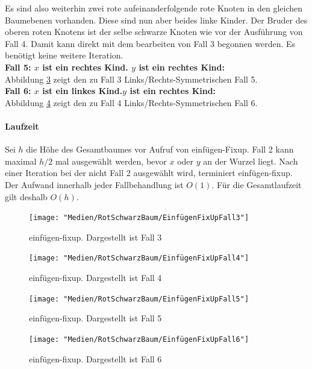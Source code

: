 \documentclass[a4paper,12pt]{article}
\begin{document}
\noindent Es sind also weiterhin zwei rote aufeinanderfolgende rote Knoten in den gleichen Baumebenen vorhanden. Diese sind nun aber beides linke Kinder. Der Bruder des oberen roten Knotens ist der selbe schwarze Knoten wie vor der Ausführung von Fall 4. Damit kann direkt mit dem bearbeiten von Fall 3 begonnen werden. Es benötigt keine weitere Iteration.\\

\noindent\textbf{Fall 5: $x$ ist ein rechtes Kind. $y$ ist ein rechtes Kind: }\\ 
Abbildung \ref{fig:EinfügenFixUpFall5} zeigt den zu Fall 3 Links/Rechts-Symmetrischen Fall 5.\\
\noindent\textbf{Fall 6:  $x$ ist ein linkes Kind.$y$ ist ein rechtes Kind: }\\ 
Abbildung \ref{fig:EinfügenFixUpFall6} zeigt den zu Fall 4 Links/Rechts-Symmetrischen Fall 6.\\


\paragraph{Laufzeit}
\noindent  Sei $h$ die Höhe des Gesamtbaumes vor Aufruf von einfügen-Fixup. Fall 2 kann maximal $h / 2$ mal ausgewählt werden, bevor $x$ oder $y$ an der Wurzel liegt. Nach einer Iteration bei der nicht Fall 2 ausgewählt wird, terminiert einfügen-fixup. Der Aufwand innerhalb jeder Fallbehandlung ist $O(1)$. Für die Gesamtlaufzeit gilt deshalb $\mathit{O(h)}$.
\begin{figure}[H]
	\centering
	\texttt{[image: "Medien/RotSchwarzBaum/EinfügenFixUpFall3"]}
	\caption{einfügen-fixup. Dargestellt ist Fall 3  }
	\label{fig:EinfügenFixUpFall3}
\end{figure}

\begin{figure}[h]
	\centering
	\texttt{[image: "Medien/RotSchwarzBaum/EinfügenFixUpFall4"]}
	\caption{einfügen-fixup. Dargestellt ist Fall 4  }
	\label{fig:EinfügenFixUpFall4}
\end{figure}

\begin{figure}[H]
	\centering
	\texttt{[image: "Medien/RotSchwarzBaum/EinfügenFixUpFall5"]}
	\caption{einfügen-fixup. Dargestellt ist Fall 5  }
	\label{fig:EinfügenFixUpFall5}
\end{figure}
\begin{figure}[H]
	\centering
	\texttt{[image: "Medien/RotSchwarzBaum/EinfügenFixUpFall6"]}
	\caption{einfügen-fixup. Dargestellt ist Fall 6  }
	\label{fig:EinfügenFixUpFall6}
\end{figure}   
\end{document}
